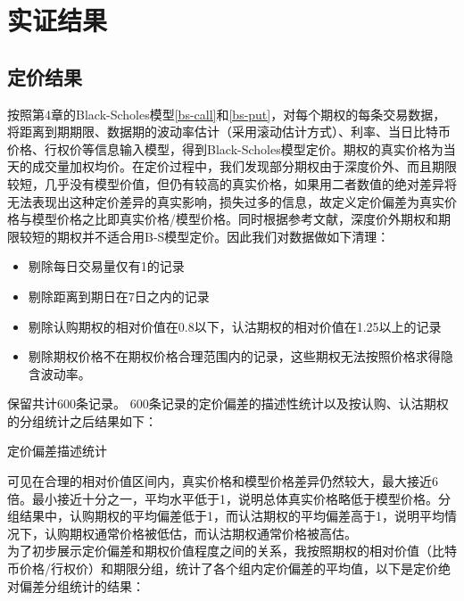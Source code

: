 \chapter{实证结果}
\section{定价结果}
按照第4章的Black-Scholes模型\ref{bs-call}和\ref{bs-put}，对每个期权的每条交易数据，将距离到期期限、数据期的波动率估计（采用滚动估计方式）、利率、当日比特币价格、行权价等信息输入模型，得到Black-Scholes模型定价。期权的真实价格为当天的成交量加权均价。在定价过程中，我们发现部分期权由于深度价外、而且期限较短，几乎没有模型价值，但仍有较高的真实价格，如果用二者数值的绝对差异将无法表现出这种定价差异的真实影响，损失过多的信息，故定义定价偏差为真实价格与模型价格之比即真实价格/模型价格。同时根据参考文献，深度价外期权和期限较短的期权并不适合用B-S模型定价\cite{10.2307/1831029}\cite{Jame-1979}。因此我们对数据做如下清理：
\begin{itemize}
    \item 剔除每日交易量仅有1的记录
    \item 剔除距离到期日在7日之内的记录
    \item 剔除认购期权的相对价值在0.8以下，认沽期权的相对价值在1.25以上的记录
    \item 剔除期权价格不在期权价格合理范围内的记录，这些期权无法按照价格求得隐含波动率。
\end{itemize}
保留共计600条记录。
600条记录的定价偏差的描述性统计以及按认购、认沽期权的分组统计之后结果如下：
~\\
\begin{center}
    \begin{threeparttable}[H]
    
        \begin{small}
            \caption{定价偏差描述统计}
            \label{tab:option_bias_group}
                
                
        \end{small} 
    \end{threeparttable}
\end{center}
可见在合理的相对价值区间内，真实价格和模型价格差异仍然较大，最大接近6倍。最小接近十分之一，平均水平低于1，说明总体真实价格略低于模型价格。分组结果中，认购期权的平均偏差低于1，而认沽期权的平均偏差高于1，说明平均情况下，认购期权通常价格被低估，而认沽期权通常价格被高估。
~\\
为了初步展示定价偏差和期权价值程度之间的关系，我按照期权的相对价值（比特币价格/行权价）和期限分组，统计了各个组内定价偏差的平均值，以下是定价绝对偏差分组统计的结果：
